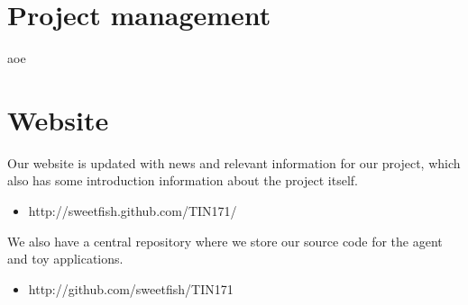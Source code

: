 \section*{Project management}
aoe

\section*{Website}
Our website is updated with news and relevant information for our project, which also has some introduction information about the project itself.
\begin{itemize}
  \item http://sweetfish.github.com/TIN171/
\end{itemize}

We also have a central repository where we store our source code for the agent and toy applications.

\begin{itemize}
  \item http://github.com/sweetfish/TIN171
\end{itemize}
